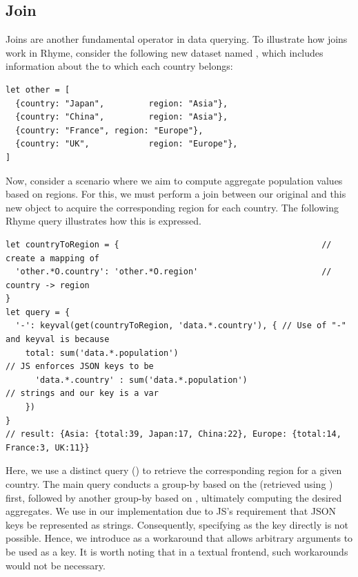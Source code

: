 \documentclass[runningheads]{llncs}
\newcommand{\lang}{Rhyme}
\begin{document}
\vspace{-3mm}
\subsection{Join}
\vspace{-2mm}
Joins are another fundamental operator in data querying.
To illustrate how joins work in \lang{}, consider the following
new dataset named , which includes information about the
 to which each country belongs:

\begin{lstlisting}[style=JavaScript, columns=flexible]
let other = [
  {country: "Japan",         region: "Asia"},
  {country: "China",         region: "Asia"},
  {country: "France", region: "Europe"},
  {country: "UK",            region: "Europe"},
]
\end{lstlisting}
\vspace{-2mm}

Now, consider a scenario where we aim to compute aggregate population
values based on regions.
For this, we must perform a join between our original
 and this new  object to acquire the
corresponding region for each country.
The following \lang{} query illustrates how this is expressed.

\begin{lstlisting}[style=JavaScript, columns=flexible]
let countryToRegion = {                                         // create a mapping of 
  'other.*O.country': 'other.*O.region'                         // country -> region
}
let query = {
  '-': keyval(get(countryToRegion, 'data.*.country'), { // Use of "-" and keyval is because
    total: sum('data.*.population')                                       // JS enforces JSON keys to be
      'data.*.country' : sum('data.*.population')                         // strings and our key is a var
    })
}
// result: {Asia: {total:39, Japan:17, China:22}, Europe: {total:14, France:3, UK:11}}
\end{lstlisting}

Here, we use a distinct query () to retrieve the
corresponding region for a given country.
The main query conducts a group-by based on the  (retrieved using ) 
first, followed by another group-by based on , ultimately computing the
desired aggregates.
We use  in our implementation due to JS's requirement that JSON
keys be represented as strings.
Consequently, specifying  as the key directly
is not possible.
Hence, we introduce  as a workaround that allows arbitrary
arguments to be used as a key.
It is worth noting that in a textual frontend, such workarounds would not be necessary.
\end{document}
